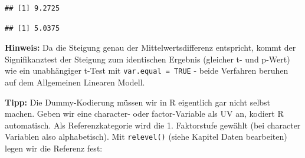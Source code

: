 \documentclass[
]{book}
\newenvironment{Shaded}{\begin{snugshade}}{\end{snugshade}}
\newcommand{\AttributeTok}[1]{\textcolor[rgb]{0.13,0.29,0.53}{#1}}
\newcommand{\FunctionTok}[1]{\textcolor[rgb]{0.13,0.29,0.53}{\textbf{#1}}}
\newcommand{\NormalTok}[1]{#1}
\newcommand{\OtherTok}[1]{\textcolor[rgb]{0.56,0.35,0.01}{#1}}
\newcommand{\SpecialCharTok}[1]{\textcolor[rgb]{0.81,0.36,0.00}{\textbf{#1}}}
\newcommand{\StringTok}[1]{\textcolor[rgb]{0.31,0.60,0.02}{#1}}
\begin{document}
\begin{Shaded}
\end{Shaded}

\begin{verbatim}
## [1] 9.2725
\end{verbatim}

\begin{Shaded}
\end{Shaded}

\begin{verbatim}
## [1] 5.0375
\end{verbatim}

\textbf{Hinweis:} Da die Steigung genau der Mittelwertsdifferenz entspricht, kommt der Signifikanztest der Steigung zum identischen Ergebnis (gleicher t- und p-Wert) wie ein unabhängiger t-Test mit \texttt{var.equal\ =\ TRUE} - beide Verfahren beruhen auf dem Allgemeinen Linearen Modell.

\textbf{Tipp:} Die Dummy-Kodierung müssen wir in R eigentlich gar nicht selbst machen. Geben wir eine character- oder factor-Variable als UV an, kodiert R automatisch. Als Referenzkategorie wird die 1. Faktorstufe gewählt (bei character Variablen also alphabetisch). Mit \texttt{relevel()} (siehe Kapitel Daten bearbeiten) legen wir die Referenz fest:

\begin{Shaded}
\end{Shaded}
\end{document}
